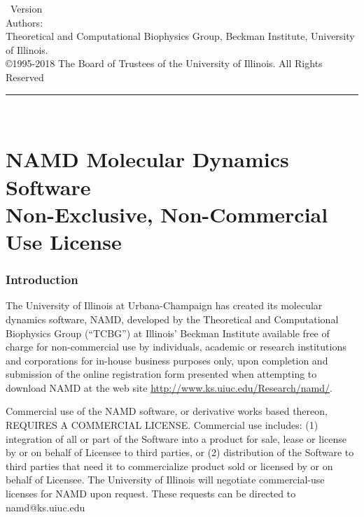 
\thispagestyle{empty}

\vspace*{0.1in}

\begin{centering}
{\LARGE \NAMD\ Version \NAMDVER}\\
\bigskip
{\large Authors: \NAMDAUTHORS} \\
\medskip
{\large Theoretical and Computational Biophysics Group, Beckman Institute, University of Illinois.} \\
\bigskip
{\large \copyright 1995-2018 The Board of Trustees of the University of Illinois.
All Rights Reserved} \\
\bigskip
\end{centering}

  \rule{6in}{0.04in}				\\	\vspace{0.25in}

\section*{NAMD Molecular Dynamics Software \\
Non-Exclusive, Non-Commercial Use License}

\subsubsection*{Introduction}

The University of Illinois at Urbana-Champaign has created its molecular
dynamics software, NAMD, developed by the Theoretical and Computational Biophysics 
Group (``TCBG'') at Illinois' Beckman Institute available free of charge for
non-commercial use by individuals, academic or research institutions and
corporations for in-house business purposes only, upon completion and
submission of the online registration form presented when attempting to
download NAMD at the web site \url{http://www.ks.uiuc.edu/Research/namd/}.

Commercial use of the NAMD software, or derivative works based thereon,
REQUIRES A COMMERCIAL LICENSE. Commercial use includes: 
(1) integration of all or part of the Software into a product for sale, 
lease or license by or on behalf of Licensee to third parties, or 
(2) distribution of the Software to third parties that need it to 
commercialize product sold or licensed by or on behalf of Licensee.  
The University of Illinois will negotiate commercial-use licenses for 
NAMD upon request. These requests can be directed to namd@ks.uiuc.edu

